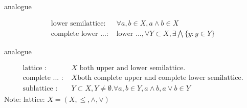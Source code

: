 \begin{Def}
    analogue
\end{Def}

\begin{Def}
    \begin{align*}
        \text{lower semilattice: } & \forall a,b \in X, a \wedge b \in X    \\
        \text{complete lower ...: } & \text{lower ...}, \forall Y \subset X, \exists\bigwedge \{y:y\in Y\}
    \end{align*}
\end{Def}

\begin{Def}
    analogue    
\end{Def}

\begin{Def}
    \begin{align*}
        \text{lattice : } & X \text{ both upper and lower semilattice.} \\
        \text{complete ... : } & X \text{both complete upper and complete lower semilattice.}   \\
        \text{sublattice : } & Y\subset X,Y\neq \emptyset. \forall a,b\in Y, a\wedge b, a\vee b \in Y
    \end{align*}
    Note: lattice: $X=(X,\leq, \wedge,\vee)$
\end{Def}

